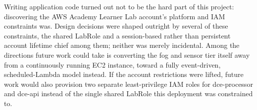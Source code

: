 \documentclass[conference]{IEEEtran}
\begin{document}
Writing application code turned out not to be the hard part of this project: discovering the AWS Academy Learner Lab account's platform and IAM constraints was. Design decisions were shaped outright by several of these constraints, the shared LabRole and a session-based rather than persistent account lifetime chief among them; neither was merely incidental. Among the directions future work could take is converting the fog and sensor tier itself away from a continuously running EC2 instance, toward a fully event-driven, scheduled-Lambda model instead. If the account restrictions were lifted, future work would also provision two separate least-privilege IAM roles for dce-processor and dce-api instead of the single shared LabRole this deployment was constrained to.



\end{document}

